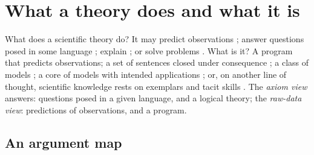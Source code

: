 \section{What a theory does and what it is}\label{sec:phil}

What does a scientific theory do? It may predict observations \citep{solomonoff1964formal}; answer questions posed in some language \citep[ch.~5]{vanfraassen1980scientific}; explain \citep{hempel1948studies}; or solve problems \citep{laudan1977progress}. What is it? A program that predicts observations; a set of sentences closed under consequence \citep{suppe1977structure}; a class of models \citep{suppes1960comparison,vanfraassen1980scientific}; a core of models with intended applications \citep{sneed1971logical,balzer1987architectonic}; or, on another line of thought, scientific knowledge rests on exemplars and tacit skills \citep{kuhn1970structure,kuhn1977second,polanyi1958personal}. The \emph{axiom view} answers: questions posed in a given language, and a logical theory; the \emph{raw-data view}: predictions of observations, and a program.

\subsection{An argument map}\label{sec:phil:map}

